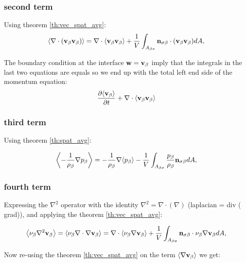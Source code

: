 \subsubsection{second term}

Using theorem \ref{th:vec_spat_avg}:
\begin{equation}
{\left< \nabla \cdot (\textbf{v}_{\beta}\textbf{v}_{\beta}) \right>} = \nabla \cdot {\left< \textbf{v}_{\beta}\textbf{v}_{\beta}\right>} + \dfrac{1}{V} \int_{A_{\beta \sigma}} \mathbf{n}_{\sigma \beta} \cdot (\textbf{v}_{\beta} \textbf{v}_{\beta}) dA,
\end{equation}


The boundary condition at the interface $\mathbf{w} = \textbf{v}_{\beta}$ imply that the integrals in the last two equations are equals so we end up with the total left end side of the momentum equation:
$$
\frac{\partial {\left< \textbf{v}_{\beta}\right>}}{\partial t} + \nabla \cdot {\left< \textbf{v}_{\beta}\textbf{v}_{\beta}\right>}
$$

\subsubsection{third term}

Using theorem \ref{th:spat_avg}:

\begin{equation}
{\left< -\dfrac{1}{\rho_{\beta}} \nabla p_{\beta}\right>} = -\dfrac{1}{\rho_{\beta}} \nabla {\left< p_{\beta}\right>} -\dfrac{1}{V} \int_{A_{\beta \sigma}} \dfrac{p_{\beta}}{\rho_{\beta}} \mathbf{n}_{\sigma \beta} dA,
\end{equation}

\subsubsection{fourth term}
Expressing the $\nabla^2$ operator with the identity $\nabla^2 = \nabla \cdot (\nabla)$ (laplacian = div ( grad)), and applying the theorem \ref{th:vec_spat_avg}:


\begin{equation}
{\left< \nu_{\beta}\nabla^2 \textbf{v}_{\beta}\right>} = {\left< \nu_{\beta}\nabla \cdot \nabla \textbf{v}_{\beta} \right>} = \nabla \cdot {\left< \nu_{\beta}\nabla \textbf{v}_{\beta}\right>} +\dfrac{1}{V} \int_{A_{\beta \sigma}} \mathbf{n}_{\sigma \beta} \cdot \nu_{\beta} \nabla \textbf{v}_{\beta} dA,
	\label{eq:4_1}
\end{equation}

Now re-using the theorem \ref{th:vec_spat_avg} on the term ${\left< \nabla \textbf{v}_{\beta} \right>}$ we get:

